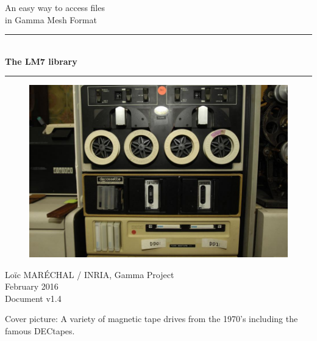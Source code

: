 \documentclass[a4paper,12pt]{article}
\newcommand{\HRule}{\rule{\linewidth}{1mm}}
\begin{document}
%
%

\begin{titlepage}

\begin{center}
\huge An easy way to access files\\ in Gamma Mesh Format
\HRule \\
\medskip
{\Huge \bfseries The LM7 library} \\
\HRule
\end{center}

\vfill

\begin{figure}[htbp]
\begin{center}
\includegraphics[width=14cm]{tape.jpeg}
\end{center}
\end{figure}

\vfill

\begin{flushright}
\Large Lo\"ic MAR\'ECHAL / INRIA, Gamma Project\\
\Large February 2016 \\
\normalsize Document v1.4
\end{flushright}

\end{titlepage}

\clearpage

\setcounter{tocdepth}{2}
\tableofcontents
\vfill

\footnotesize{Cover picture: A variety of magnetic tape drives from the 1970’s including the famous DECtapes.}
\normalsize

\clearpage


%
%
\end{document}
